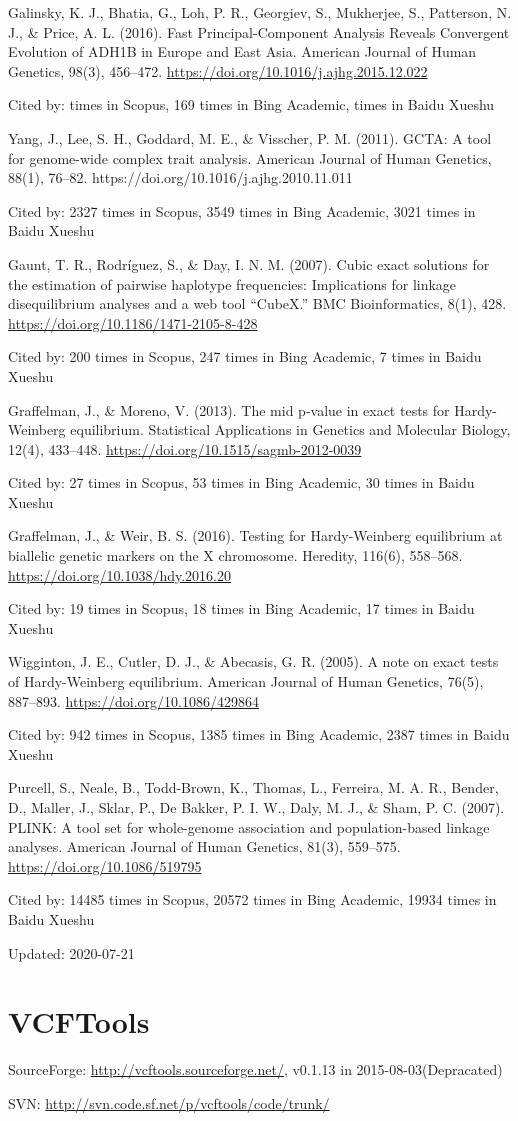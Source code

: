 \documentclass[]{article}
\newcommand{\de}{{\color{red}(Depracated)}}
\newcommand{\cb}[3]{\par Cited by: {\color{blue}\Huge #1} times in Scopus, {\color{blue}\Huge #2} times in Bing Academic, {\color{blue}\Huge #3} times in Baidu Xueshu}
\begin{document}
Galinsky, K. J., Bhatia, G., Loh, P. R., Georgiev, S., Mukherjee, S., Patterson, N. J., \& Price, A. L. (2016). Fast Principal-Component Analysis Reveals Convergent Evolution of ADH1B in Europe and East Asia. American Journal of Human Genetics, 98(3), 456–472. \url{https://doi.org/10.1016/j.ajhg.2015.12.022}\cb{}{169}{}

Yang, J., Lee, S. H., Goddard, M. E., \& Visscher, P. M. (2011). GCTA: A tool for genome-wide complex trait analysis. American Journal of Human Genetics, 88(1), 76–82. {https://doi.org/10.1016/j.ajhg.2010.11.011}\cb{2327}{3549}{3021}

Gaunt, T. R., Rodríguez, S., \& Day, I. N. M. (2007). Cubic exact solutions for the estimation of pairwise haplotype frequencies: Implications for linkage disequilibrium analyses and a web tool ``CubeX.'' BMC Bioinformatics, 8(1), 428. \url{https://doi.org/10.1186/1471-2105-8-428}\cb{200}{247}{7}

Graffelman, J., \& Moreno, V. (2013). The mid p-value in exact tests for Hardy-Weinberg equilibrium. Statistical Applications in Genetics and Molecular Biology, 12(4), 433–448. \url{https://doi.org/10.1515/sagmb-2012-0039}\cb{27}{53}{30}

Graffelman, J., \& Weir, B. S. (2016). Testing for Hardy-Weinberg equilibrium at biallelic genetic markers on the X chromosome. Heredity, 116(6), 558–568. \url{https://doi.org/10.1038/hdy.2016.20}\cb{19}{18}{17}

Wigginton, J. E., Cutler, D. J., \& Abecasis, G. R. (2005). A note on exact tests of Hardy-Weinberg equilibrium. American Journal of Human Genetics, 76(5), 887–893. \url{https://doi.org/10.1086/429864}\cb{942}{1385}{2387}

Purcell, S., Neale, B., Todd-Brown, K., Thomas, L., Ferreira, M. A. R., Bender, D., Maller, J., Sklar, P., De Bakker, P. I. W., Daly, M. J., \& Sham, P. C. (2007). PLINK: A tool set for whole-genome association and population-based linkage analyses. American Journal of Human Genetics, 81(3), 559–575. \url{https://doi.org/10.1086/519795}\cb{14485}{20572}{19934}

Updated: 2020-07-21

\section{VCFTools}

SourceForge: \url{http://vcftools.sourceforge.net/}, v0.1.13 in 2015-08-03\de

SVN: \url{http://svn.code.sf.net/p/vcftools/code/trunk/}
\end{document}

